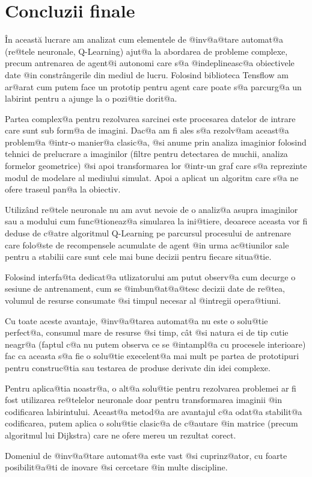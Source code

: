 

\chapter*{Concluzii finale}



\^ In aceast\u a lucrare am analizat cum elementele de @inv@a@tare automat@a (re@tele neuronale, Q-Learning) ajut@a la abordarea de probleme complexe, precum antrenarea de agent@i autonomi care s@a @indeplineasc@a obiectivele date @in constr\^ angerile din mediul de lucru. Folosind biblioteca Tensflow am ar@arat cum putem face un prototip pentru agent care poate s@a parcurg@a un labirint pentru a ajunge la o pozi@tie dorit@a. 

Partea complex@a pentru rezolvarea sarcinei este procesarea datelor de intrare care sunt sub form@a de imagini. Dac@a am fi ales s@a rezolv@am aceast@a problem@a @intr-o manier@a clasic@a, @si anume prin analiza imaginior folosind tehnici de prelucrare a imaginilor (filtre pentru detectarea de muchii, analiza formelor geometrice) @si apoi transformarea lor @intr-un graf care s@a reprezinte modul de modelare al mediului simulat. Apoi a aplicat un algoritm care s@a ne ofere traseul pan@a la obiectiv.

Utiliz\^ and re@tele neuronale nu am avut nevoie de o analiz@a asupra imaginilor sau a modului cum func@tioneaz@a simularea la ini@tiere, deoarece aceasta vor fi deduse de c@atre algoritmul Q-Learning pe parcursul procesului de antrenare care folo@ste de recompensele acumulate de agent @in urma ac@tiunilor sale pentru a stabilii care sunt cele mai bune decizii pentru fiecare situa@tie.

Folosind interfa@ta dedicat@a utlizatorului am putut observ@a cum decurge o sesiune de antrenament, cum se @imbun@at@a@tesc decizii date de re@tea, volumul de resurse consumate @si timpul necesar al @intregii opera@tiuni.

Cu toate aceste avantaje, @inv@a@tarea automat@a nu este o solu@tie perfect@a, consumul mare de resurse @si timp, c\^ at @si natura ei de tip cutie neagr@a (faptul c@a nu putem observa ce se @intampl@a cu procesele interioare) fac ca aceasta s@a fie o solu@tie execelent@a mai mult pe partea de prototipuri pentru construc@tia sau testarea de produse derivate din idei complexe. 

Pentru aplica@tia noastr@a, o alt@a solu@tie pentru rezolvarea problemei ar fi fost utilizarea re@telelor neuronale doar pentru transformarea imaginii @in codificarea labirintului. Aceast@a metod@a are avantajul c@a odat@a stabilit@a codificarea, putem aplica o solu@tie clasic@a de c@autare @in matrice (precum algoritmul lui Dijkstra) care ne ofere mereu un rezultat corect. 

Domeniul de @inv@a@tare automat@a este vast @si cuprinz@ator, cu foarte posibilit@a@ti de inovare @si cercetare @in multe discipline.


